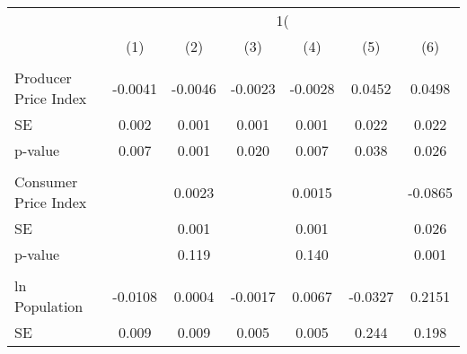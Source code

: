 {
\def\sym#1{\ifmmode^{#1}\else\(^{#1}\)\fi}
\begin{tabular}{l*{6}{c}}
\hline\hline
                    &&&\\\cmidrule(lr){2-3}\cmidrule(lr){4-5}\cmidrule(lr){6-7}
                    &         &         &         &         &         &         \\
\hline
\hline
\\ Producer Price Index&     -0.0041         &     -0.0046         &     -0.0023         &     -0.0028         &      0.0452         &      0.0498         \\
\hspace{15pt} SE    &       0.002         &       0.001         &       0.001         &       0.001         &       0.022         &       0.022         \\
\hspace{15pt} p-value&       0.007         &       0.001         &       0.020         &       0.007         &       0.038         &       0.026         \\
\\ Consumer Price Index&                     &      0.0023         &                     &      0.0015         &                     &     -0.0865         \\
\hspace{15pt} SE    &                     &       0.001         &                     &       0.001         &                     &       0.026         \\
\hspace{15pt} p-value&                     &       0.119         &                     &       0.140         &                     &       0.001         \\
\\ ln Population    &     -0.0108         &      0.0004         &     -0.0017         &      0.0067         &     -0.0327         &      0.2151         \\
\hspace{15pt} SE    &       0.009         &       0.009         &       0.005         &       0.005         &       0.244         &       0.198         \\

\end{tabular}}
